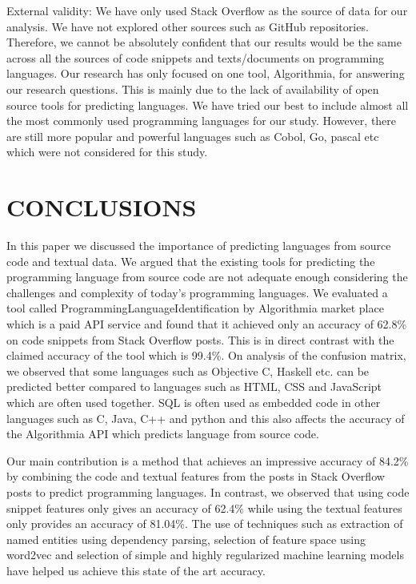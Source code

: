 \documentclass[letterpaper, 10 pt, conference]{ieeeconf}  %
\begin{document}
External validity: We have only used Stack Overflow as the source of data for our analysis. We have not explored other sources such as GitHub repositories. Therefore, we cannot be absolutely confident that our results would be the same across all the sources of code snippets and texts/documents on programming languages. Our research has only focused on one tool, Algorithmia, for answering our research questions. This is mainly due to the lack of availability of open source tools for predicting languages. We have tried our best to include almost all the most commonly used programming languages for our study. However, there are still more popular and powerful languages such as Cobol, Go, pascal etc which were not considered for this study.

\section{CONCLUSIONS}

In this paper we discussed the importance of predicting languages from source code and textual data. We argued that the existing tools for predicting the programming language from source code are not adequate enough considering the challenges and complexity of today's programming languages. We evaluated a tool called ProgrammingLanguageIdentification by Algorithmia market place which is a paid API service and found that it achieved only an accuracy of 62.8\% on code snippets from Stack Overflow posts. This is in direct contrast with the claimed accuracy of the tool which is 99.4\%. On analysis of the confusion matrix, we observed that some languages such as Objective C, Haskell etc. can be predicted better compared to languages such as HTML, CSS and JavaScript which are often used together.  SQL is often used as embedded code in other languages such as C, Java, C++ and python and this also affects the accuracy of the Algorithmia API which predicts language from source code.
 
Our main contribution is a method that achieves an impressive accuracy of 84.2\% by combining the code and textual features from the posts in Stack Overflow posts to predict programming languages. In contrast, we observed that using code snippet features only gives an accuracy of 62.4\% while using the textual features only provides an accuracy of 81.04\%. The use of techniques such as extraction of named entities using dependency parsing, selection of feature space using word2vec and selection of simple and highly regularized machine learning models have helped us achieve this state of the art accuracy. 
\end{document}
